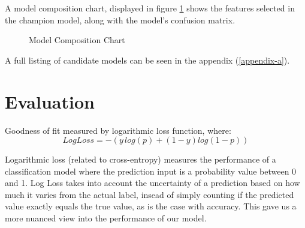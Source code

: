 \label{eq:1}
\vskip 1cm

A model composition chart, displayed in figure \ref{fig:model5features} shows the features selected in the champion model, along with the model's confusion matrix.

\begin{figure}[!hb]
    \caption{\label{fig:model5features} Model Composition Chart}
\end{figure}
\cite{cm}

A full listing of candidate models can be seen in the appendix (\ref{appendix-a}).

\section{Evaluation}


Goodness of fit measured by logarithmic loss function, where: $$ Log Loss = -(y\,log(p) + (1 - y)log(1 - p)) $$

\par Logarithmic loss (related to cross-entropy) measures the performance of a classification model where the prediction input is a probability value between 0 and 1. Log Loss takes into account the uncertainty of a prediction based on how much it varies from the actual label, insead of simply counting if the predicted value exactly equals the true value, as is the case with accuracy. This gave us a more nuanced view into the performance of our model.